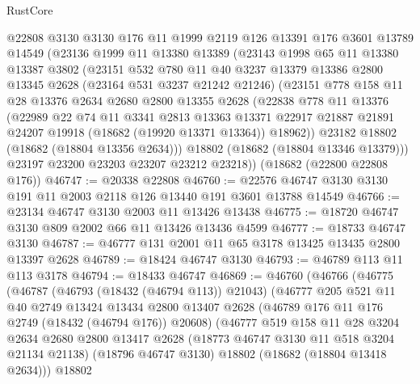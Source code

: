 \begin{lexlean}{RustCore}
\begin{coremodule}
    @22808
    @3130
    @3130
    @176
    @11
    @1999
    @2119
    @126
    @13391
    @176
    @3601
    @13789
    @14549
    (@23136
      @1999
      @11
      @13380
      @13389
      (@23143
        @1998
        @65
        @11
        @13380
        @13387
        @3802
        (@23151
          @532
          @780
          @11
          @40
          @3237
          @13379
          @13386
          @2800
          @13345
          @2628
          (@23164 @531 @3237 @21242 @21246)
          (@23151
            @778
            @158
            @11
            @28
            @13376
            @2634
            @2680
            @2800
            @13355
            @2628
            (@22838
              @778
              @11
              @13376
              (@22989
                @22
                @74
                @11
                @3341
                @2813
                @13363
                @13371
                @22917
                @21887
                @21891
                @24207
                @19918
                (@18682 (@19920 @13371 @13364))
                @18962))
            @23182
            @18802
            (@18682 (@18804 @13356 @2634)))
          @18802
          (@18682 (@18804 @13346 @13379)))
        @23197
        @23200
        @23203
        @23207
        @23212
        @23218))
    (@18682 (@22800 @22808 @176))
@46747 := @20338 @22808
@46760 := @22576 @46747 @3130 @3130 @191 @11 @2003 @2118 @126 @13440 @191 @3601 @13788 @14549
@46766 := @23134 @46747 @3130 @2003 @11 @13426 @13438
@46775 := @18720 @46747 @3130 @809 @2002 @66 @11 @13426 @13436 @4599
@46777 := @18733 @46747 @3130
@46787 := @46777 @131 @2001 @11 @65 @3178 @13425 @13435 @2800 @13397 @2628
@46789 := @18424 @46747 @3130
@46793 := @46789 @113 @11 @113 @3178
@46794 := @18433 @46747
@46869 := @46760
    (@46766
      (@46775
        (@46787
          (@46793 (@18432 (@46794 @113)) @21043)
          (@46777
            @205
            @521
            @11
            @40
            @2749
            @13424
            @13434
            @2800
            @13407
            @2628
            (@46789 @176 @11 @176 @2749 (@18432 (@46794 @176)) @20608)
            (@46777
              @519
              @158
              @11
              @28
              @3204
              @2634
              @2680
              @2800
              @13417
              @2628
              (@18773 @46747 @3130 @11 @518 @3204 @21134 @21138)
              (@18796 @46747 @3130)
              @18802
              (@18682 (@18804 @13418 @2634)))
            @18802

\end{coremodule}
\end{lexlean}
